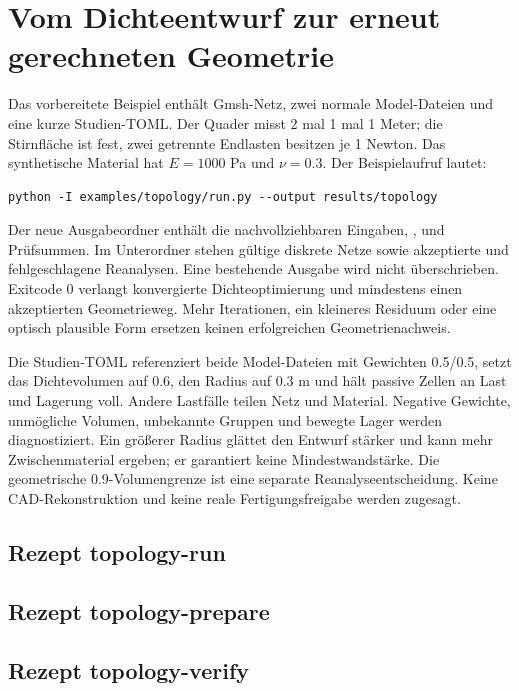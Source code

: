 \chapter{Vom Dichteentwurf zur erneut gerechneten Geometrie}\label{user:topology}
Das vorbereitete Beispiel enthält Gmsh-Netz, zwei normale Model-Dateien und
eine kurze Studien-TOML. Der Quader misst 2 mal 1 mal 1 Meter; die Stirnfläche
ist fest, zwei getrennte Endlasten besitzen je 1 Newton. Das synthetische
Material hat \(E=1000\) Pa und \(\nu=0.3\). Der Beispielaufruf lautet:
\begin{lstlisting}
python -I examples/topology/run.py --output results/topology
\end{lstlisting}
Der neue Ausgabeordner enthält die nachvollziehbaren Eingaben,
,  und Prüfsummen. Im Unterordner
 stehen gültige diskrete Netze sowie akzeptierte und
fehlgeschlagene Reanalysen. Eine bestehende Ausgabe wird nicht überschrieben.
Exitcode 0 verlangt konvergierte Dichteoptimierung und mindestens einen
akzeptierten Geometrieweg. Mehr Iterationen, ein kleineres Residuum oder eine
optisch plausible Form ersetzen keinen erfolgreichen Geometrienachweis.

Die Studien-TOML referenziert beide Model-Dateien mit Gewichten 0.5/0.5,
setzt das Dichtevolumen auf 0.6, den Radius auf 0.3 m und hält passive Zellen
an Last und Lagerung voll. Andere Lastfälle teilen Netz und Material.
Negative Gewichte, unmögliche Volumen, unbekannte Gruppen und bewegte Lager
werden diagnostiziert. Ein größerer Radius glättet den Entwurf stärker und
kann mehr Zwischenmaterial ergeben; er garantiert keine Mindestwandstärke.
Die geometrische 0.9-Volumengrenze ist eine separate Reanalyseentscheidung.
Keine CAD-Rekonstruktion und keine reale Fertigungsfreigabe werden zugesagt.

\section{Rezept topology-run}\label{recipe:topology-run}


\section{Rezept topology-prepare}\label{recipe:topology-prepare}


\section{Rezept topology-verify}\label{recipe:topology-verify}

